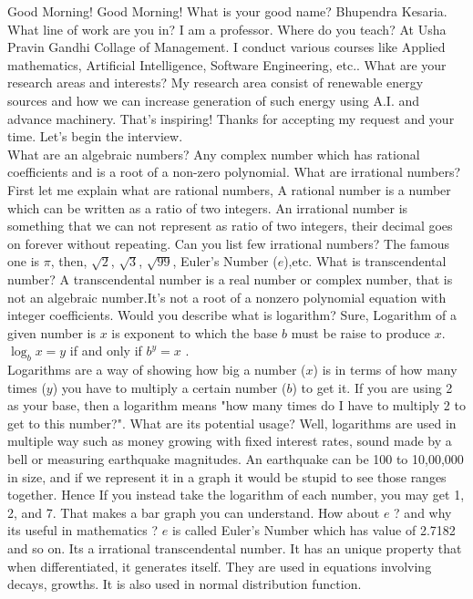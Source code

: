 \documentclass{article}
\begin{document}
\begin{description}
\me Good Morning!
\prof Good Morning!
\me What is your good name?
\prof Bhupendra Kesaria.
\me What line of work are you in?
\prof I am a professor. 
\me Where do you teach?
\prof At Usha Pravin Gandhi Collage of Management. I conduct various courses like Applied mathematics, Artificial Intelligence, Software Engineering, etc..
\me What are your research areas and interests?
\prof My research area consist of renewable energy sources and how we can increase generation of such energy using A.I. and advance machinery.
\me That's inspiring! Thanks for accepting my request and your time. Let's begin the interview. \\
What are an algebraic numbers?
\prof Any complex number which has rational coefficients and is a root of a non-zero polynomial.
\me What are irrational numbers?
\prof First let me explain what are rational numbers, A rational number is a number which can be written as a ratio of two integers. An irrational number is something that we can not represent as ratio of two integers, their decimal goes on forever without repeating.
\me Can you list few irrational numbers?
\prof The famous one is $\pi$, then, $\sqrt{2}$, $\sqrt{3}$, $\sqrt{99}$, Euler's Number ($e$),etc.
\me What is transcendental number?
\prof A transcendental number is a real number or complex number, that is not an algebraic number.It's not a root of a nonzero polynomial equation with integer coefficients.
\me Would you describe what is logarithm?
\prof Sure, Logarithm of a given number is $x$ is exponent to which the base $b$ must be raise to produce $x$. \\
$\log_b{x} = y$ if and only if $b^y = x$ . \\
Logarithms are a way of showing how big a number ($x$) is in terms of how many times ($y$) you have to multiply a certain number ($b$) to get it. If you are using 2 as your base, then a logarithm means "how many times do I have to multiply 2 to get to this number?".
\me What are its potential usage?
\prof Well, logarithms are used in multiple way such as money growing with fixed interest rates, sound made by a bell or measuring earthquake magnitudes. An earthquake can be 100 to 10,00,000 in size, and if we represent it in a graph it would be stupid to see those ranges together. Hence If you instead take the logarithm of each number, you may get 1, 2, and 7. That makes a bar graph you can understand.
\me How about $e$ ? and why its useful in mathematics ?
\prof $e$ is called Euler’s Number which has value of 2.7182 and so on. Its a irrational transcendental number. It has an unique property that when differentiated, it generates itself. They are used in equations involving decays, growths. It is also used in normal distribution function.

\end{description}
\end{document}
